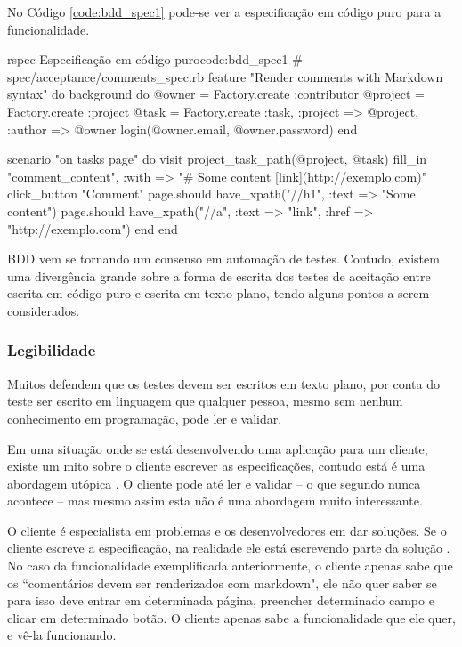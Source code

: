 No Código \ref{code:bdd_spec1} pode-se ver a especificação em código puro para a funcionalidade.

\begin{mycode}{rspec}%
{Especificação em código puro}{code:bdd_spec1}
# spec/acceptance/comments_spec.rb
feature "Render comments with Markdown syntax" do
  background do
    @owner = Factory.create :contributor
    @project = Factory.create :project
    @task = Factory.create :task, :project => @project, :author => @owner
    login(@owner.email, @owner.password)
  end

  scenario "on tasks page" do
    visit project_task_path(@project, @task)
    fill_in "comment_content", :with => "# Some content [link](http://exemplo.com)"
    click_button "Comment"
    page.should have_xpath("//h1", :text => "Some content")
    page.should have_xpath("//a", :text => "link", :href => "http://exemplo.com")
  end
end
\end{mycode}


BDD vem se tornando um consenso em automação de testes. Contudo, existem uma divergência grande sobre a forma de escrita dos testes de aceitação entre escrita em código puro e escrita em texto plano, tendo alguns pontos a serem considerados.

\subsubsection{Legibilidade} %
\label{subsub:legibilidade}

Muitos defendem que os testes devem ser escritos em texto plano, por conta do teste ser escrito em linguagem que qualquer pessoa, mesmo sem nenhum conhecimento em programação, pode ler e validar.

Em uma situação onde se está desenvolvendo uma aplicação para um cliente, existe um mito sobre o cliente escrever as especificações, contudo está é uma abordagem utópica \cite{SteakOverCucumber, CucumberForVegetarians, ClientsWritingCucumber}. O cliente pode até ler e validar – o que segundo  nunca acontece – mas mesmo assim esta não é uma abordagem muito interessante.

O cliente é especialista em problemas e os desenvolvedores em dar soluções. Se o cliente escreve a especificação, na realidade ele está escrevendo parte da solução \cite{SteakOverCucumber}. No caso da funcionalidade exemplificada anteriormente, o cliente apenas sabe que os ``comentários devem ser renderizados com markdown", ele não quer saber se para isso deve entrar em determinada página, preencher determinado campo e clicar em determinado botão. O cliente apenas sabe a funcionalidade que ele quer, e vê-la funcionando.

